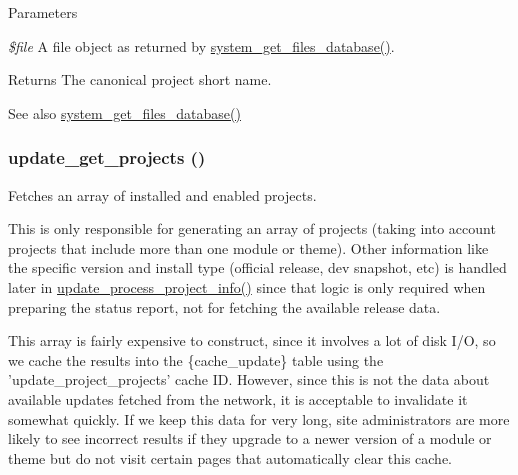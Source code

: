 \begin{DoxyParams}{Parameters}
\item[{\em \$file}]A file object as returned by \hyperlink{system_8module_a0851ffa40e4bc737b29677e9b397caac}{system\_\-get\_\-files\_\-database()}.\end{DoxyParams}
\begin{DoxyReturn}{Returns}
The canonical project short name.
\end{DoxyReturn}
\begin{DoxySeeAlso}{See also}
\hyperlink{system_8module_a0851ffa40e4bc737b29677e9b397caac}{system\_\-get\_\-files\_\-database()} 
\end{DoxySeeAlso}
\hypertarget{update_8compare_8inc_a7e1ea49d91f2d2b81b8101d481d10300}{
\subsubsection[{update\_\-get\_\-projects}]{\setlength{\rightskip}{0pt plus 5cm}update\_\-get\_\-projects ()}}
\label{update_8compare_8inc_a7e1ea49d91f2d2b81b8101d481d10300}
Fetches an array of installed and enabled projects.

This is only responsible for generating an array of projects (taking into account projects that include more than one module or theme). Other information like the specific version and install type (official release, dev snapshot, etc) is handled later in \hyperlink{update_8compare_8inc_ad14173209d3e9cf76fbd6d6d1977de05}{update\_\-process\_\-project\_\-info()} since that logic is only required when preparing the status report, not for fetching the available release data.

This array is fairly expensive to construct, since it involves a lot of disk I/O, so we cache the results into the \{cache\_\-update\} table using the 'update\_\-project\_\-projects' cache ID. However, since this is not the data about available updates fetched from the network, it is acceptable to invalidate it somewhat quickly. If we keep this data for very long, site administrators are more likely to see incorrect results if they upgrade to a newer version of a module or theme but do not visit certain pages that automatically clear this cache.

